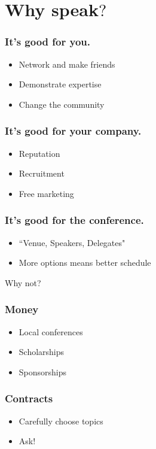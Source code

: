 \documentclass{beamer}
\begin{document}
\section{Why speak$?$}

\begin{frame}[fragile]
\tableofcontents[currentsection]
\end{frame}

\begin{frame}[fragile]
\frametitle{It's good for you.}
\begin{itemize}
\item Network and make friends
\item Demonstrate expertise
\item Change the community
\end{itemize}
\end{frame}

\begin{frame}[fragile]
\frametitle{It's good for your company.}
\begin{itemize}
\item Reputation
\item Recruitment
\item Free marketing
\end{itemize}
\end{frame}

\begin{frame}[fragile]
\frametitle{It's good for the conference.}
\begin{itemize}
\item ``Venue, Speakers, Delegates"
\item More options means better schedule
\end{itemize}
\end{frame}

\begin{frame}[fragile]
Why not?
\end{frame}


\begin{frame}[fragile]
\frametitle{Money}
\begin{itemize}
\item Local conferences
\item Scholarships
\item Sponsorships
\end{itemize}
\end{frame}

\begin{frame}[fragile]
\frametitle{Contracts}
\begin{itemize}
\item Carefully choose topics
\item Ask!
\end{itemize}
\end{frame}
\end{document}
